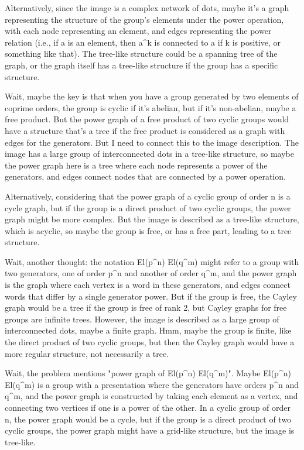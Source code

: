 Alternatively, since the image is a complex network of dots, maybe it's a graph representing the structure of the group's elements under the power operation, with each node representing an element, and edges representing the power relation (i.e., if a is an element, then a^k is connected to a if k is positive, or something like that). The tree-like structure could be a spanning tree of the graph, or the graph itself has a tree-like structure if the group has a specific structure. 

Wait, maybe the key is that when you have a group generated by two elements of coprime orders, the group is cyclic if it's abelian, but if it's non-abelian, maybe a free product. But the power graph of a free product of two cyclic groups would have a structure that's a tree if the free product is considered as a graph with edges for the generators. But I need to connect this to the image description. The image has a large group of interconnected dots in a tree-like structure, so maybe the power graph here is a tree where each node represents a power of the generators, and edges connect nodes that are connected by a power operation. 

Alternatively, considering that the power graph of a cyclic group of order n is a cycle graph, but if the group is a direct product of two cyclic groups, the power graph might be more complex. But the image is described as a tree-like structure, which is acyclic, so maybe the group is free, or has a free part, leading to a tree structure. 

Wait, another thought: the notation El(p^n) El(q^m) might refer to a group with two generators, one of order p^n and another of order q^m, and the power graph is the graph where each vertex is a word in these generators, and edges connect words that differ by a single generator power. But if the group is free, the Cayley graph would be a tree if the group is free of rank 2, but Cayley graphs for free groups are infinite trees. However, the image is described as a large group of interconnected dots, maybe a finite graph. Hmm, maybe the group is finite, like the direct product of two cyclic groups, but then the Cayley graph would have a more regular structure, not necessarily a tree. 

Wait, the problem mentions "power graph of El(p^n) El(q^m)". Maybe El(p^n) El(q^m) is a group with a presentation where the generators have orders p^n and q^m, and the power graph is constructed by taking each element as a vertex, and connecting two vertices if one is a power of the other. In a cyclic group of order n, the power graph would be a cycle, but if the group is a direct product of two cyclic groups, the power graph might have a grid-like structure, but the image is tree-like. 

